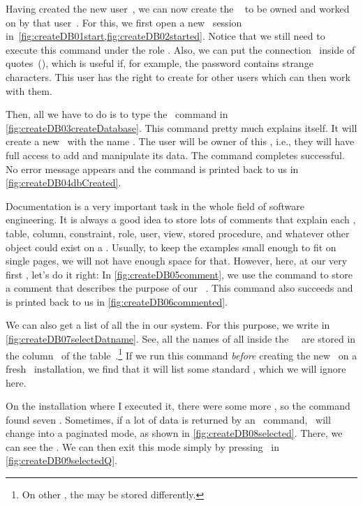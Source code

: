 %
%
%
Having created the new user~, we can now create the \db\  to be owned and worked on by that user~.
For this, we first open a new \psql\ session in~\cref{fig:createDB01start,fig:createDB02started}.
Notice that we still need to execute this command under the  role .
Also, we can put the connection~ inside of quotes~(), which is useful if, for example, the password contains strange characters.
This user has the right to create  for other users which can then work with them.

Then, all we have to do is to type the \sql\ command  in \cref{fig:createDB03createDatabase}.
This command pretty much explains itself.
It will create a new \db\ with the name .
The user  will be owner of this \db, i.e., they will have full access to add and manipulate its data.
The command completes successful.
No error message appears and the command is printed back to us in \cref{fig:createDB04dbCreated}.

Documentation is a very important task in the whole field of software engineering.
It is always a good idea to store lots of comments that explain each \db, table, column, constraint, role, user, view, stored procedure, and whatever other object could exist on a \dbms.
Usually, to keep the examples small enough to fit on single pages, we will not have enough space for that.
However, here, at our very first \db, let's do it right:
In \cref{fig:createDB05comment}, we use the  command to store a comment that describes the purpose of our \db\ .
This command also succeeds and is printed back to us in \cref{fig:createDB06commented}.%
%
\begin{sloppypar}%
We can also get a list of all the  in our system.
For this purpose, we write  in \cref{fig:createDB07selectDatname}.
See, all the names of all  inside the \postgresql\ \dbms\ are stored in the column~ of the table~.\footnote{%
On other , the  may be stored differently.}
If we run this command \emph{before} creating the new \db\ on a fresh \postgresql\ installation, we find that it will list some standard , which we will ignore here.%
\end{sloppypar}%
%
On the installation where I executed it, there were some more , so the command found seven .
Sometimes, if a lot of data is returned by an \sql\ command, \psql\ will change into a paginated mode, as shown in \cref{fig:createDB08selected}.
There, we can see the .
We can then exit this mode simply by pressing~ in \cref{fig:createDB09selectedQ}.

